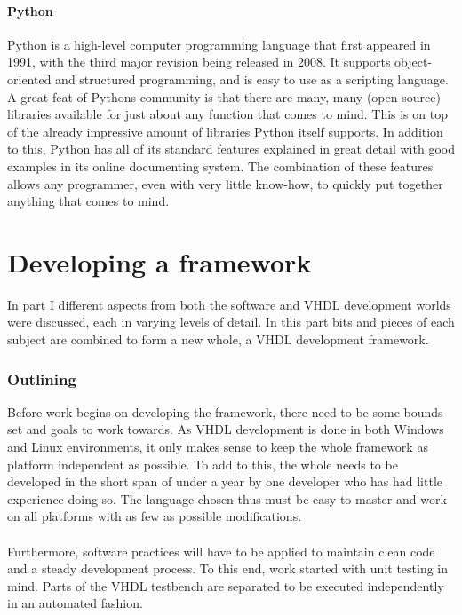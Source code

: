 \documentclass[11pt,british]{article}
\begin{document}
\subsection{Python}
Python is a high-level computer programming language that first appeared in 1991, with the third major revision being released in 2008. It supports object-oriented and structured programming, and is easy to use as a scripting language. A great feat of Pythons community is that there are many, many (open source) libraries available for just about any function that comes to mind. This is on top of the already impressive amount of libraries Python itself supports. In addition to this, Python has all of its standard features explained in great detail with good examples in its online documenting system. The combination of these features allows any programmer, even with very little know-how, to quickly put together anything that comes to mind.


\newpage
\part{Developing a framework}
In part I different aspects from both the software and \gls{VHDL} development worlds were discussed, each in  varying levels of detail. In this part bits and pieces of each subject are combined to form a new whole, a VHDL development framework.

\section{Outlining}
\label{sec:outlining}
Before work begins on developing the framework, there need to be some bounds set and goals to work towards. As VHDL development is done in both Windows and Linux environments, it only makes sense to keep the whole framework as platform independent as possible. To add to this, the whole needs to be developed in the short span of under a year by one developer who has had little experience doing so. The language chosen thus must be easy to master and work on all platforms with as few as possible modifications.\\
\\
Furthermore, software practices will have to be applied to maintain clean code and a steady development process. To this end, work started with unit testing in mind. Parts of the VHDL testbench are separated to be executed independently in an automated fashion.
\end{document}
